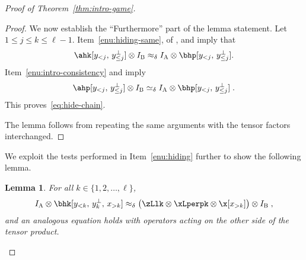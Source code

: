 \documentclass[11pt]{article}
\newtheorem{lemma}[theorem]{Lemma}
\theoremstyle{definition}
\newcommand{\Id}{\ensuremath{I}}
\newcommand{\ia}{\Id_\alice}
\newcommand{\ib}{\Id_\bob}
\newcommand{\labelstyle}[1]{\ensuremath{\textsc{#1}}\xspace}
\newcommand{\alice}{\labelstyle{A}}
\newcommand{\bob}{\labelstyle{B}}
\begin{document}
\begin{proof}[Proof of Theorem~\ref{thm:intro-game}]
\begin{proof}
    We now establish the ``Furthermore'' part of the lemma statement.
    Let $1 \leq j \leq k \leq \ell-1$.
    Item~\ref{enu:hiding-same},  of
    , and  imply that
    \begin{equation}
      \ahk[y_{<j},\, y_{\leq j}^\perp] \otimes \ib \approx_\delta
      \ia \otimes \bhp[y_{<j},\, y_{\leq j}^\perp].
    \end{equation}
    Item~\ref{enu:intro-consistency} and  imply
    \begin{equation}
      \ahp[y_{<j},\, y_{\leq j}^\perp] \otimes \ib \simeq_\delta
      \ia \otimes \bhp[y_{<j},\, y_{\leq j}^\perp]\;.
    \end{equation}
    This proves~\eqref{eq:hide-chain}.

    The lemma follows from repeating the same arguments with the tensor factors
    interchanged.
	\end{proof}
	
	We exploit the tests performed in Item~\ref{enu:hiding} further to show the
  following lemma.

  \begin{lemma}
    \label{lem:hide-rigidity}
    For all $k \in \{1, 2, \ldots, \ell\}$,
    \begin{equation*}
      \ia \otimes \bhk[y_{<k},\, y^\perp_k,\, x_{>k}] \approx_\delta
      \bigl( \zLlk \otimes \xLperpk \otimes \x[x_{>k}] \bigr) \otimes \ib\;,
    \end{equation*}
    and an analogous equation holds with operators acting on the other side of
    the tensor product.
  \end{lemma}


\end{proof}
\end{document}
